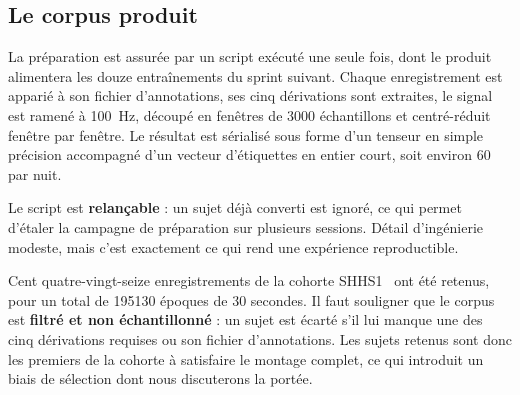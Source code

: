 \subsection{Le corpus produit}

La préparation est assurée par un script exécuté une seule fois, dont le produit
alimentera les douze entraînements du sprint suivant. Chaque enregistrement est apparié
à son fichier d'annotations, ses cinq dérivations sont extraites, le signal est ramené à
\SI{100}{\hertz}, découpé en fenêtres de \num{3000} échantillons et centré-réduit fenêtre
par fenêtre. Le résultat est sérialisé sous forme d'un tenseur en simple précision
accompagné d'un vecteur d'étiquettes en entier court, soit environ \SI{60}{\mega\octet}
par nuit.

Le script est \textbf{relançable} : un sujet déjà converti est ignoré, ce qui permet
d'étaler la campagne de préparation sur plusieurs sessions. Détail d'ingénierie modeste,
mais c'est exactement ce qui rend une expérience reproductible.

Cent quatre-vingt-seize enregistrements de la cohorte SHHS1~\cite{quan1997} ont été
retenus, pour un total de \num{195130} époques de 30 secondes. Il faut souligner que le
corpus est \textbf{filtré et non échantillonné} : un sujet est écarté s'il lui manque une
des cinq dérivations requises ou son fichier d'annotations. Les sujets retenus sont donc
les premiers de la cohorte à satisfaire le montage complet, ce qui introduit un biais de
sélection dont nous discuterons la portée.


